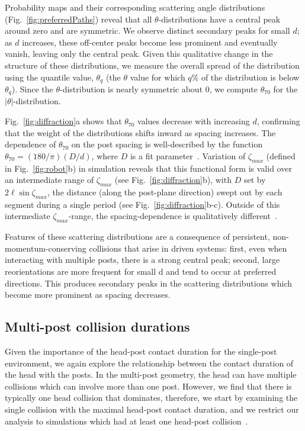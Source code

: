 \documentclass[aps,pre,twocolumn,superscriptaddress]{revtex4-1}
\begin{document}
Probability maps and their corresponding scattering angle distributions (Fig.~\ref{fig:preferredPaths}) reveal that all $\theta$-distributions have a central peak around zero and are symmetric.  We observe distinct secondary peaks for small $d$; as $d$ increases, these off-center peaks become less prominent and eventually vanish, leaving only the central peak.  Given this qualitative change in the structure of these distributions, we measure the overall spread of the distribution using the quantile value, $\theta_q$ (the $\theta$ value for which $q\%$ of the distribution is below $\theta_{q}$). Since the $\theta$-distribution is nearly symmetric about $0$, we compute $\theta_{70}$ for the $|\theta|$-distribution.

Fig.~\ref{fig:diffraction}a shows that $\theta_{70}$ values decrease with increasing $d$, confirming that the weight of the distributions shifts inward as spacing increases. The dependence of $\theta_{70}$ on the post spacing is well-described by the function $\theta_{70} = (180 / \pi)(D/d)$, where $D$ is a fit parameter~\cite{fitnote}. Variation of $\zeta_{max}$ (defined in Fig.~\ref{fig:robot}b) in simulation reveals that this functional form is valid over an intermediate range of $\zeta_{max}$ (see Fig.~\ref{fig:diffraction}b), with $D$ set by $2\ell\sin\zeta_{max}$, the distance (along the post-plane direction) swept out by each segment during a single period (see Fig.~\ref{fig:diffraction}b-c). Outside of this intermediate $\zeta_{max}$-range, the spacing-dependence is qualitatively different~\cite{supplemental}.  

Features of these scattering distributions are a consequence of persistent, non-momentum-conserving collisions that arise in driven systems: first, even when interacting with multiple posts, there is a strong central peak; second, large reorientations are more frequent for small d and tend to occur at preferred directions. This produces secondary peaks in the scattering distributions which become more prominent as spacing decreases.
 

\subsection{Multi-post collision durations}\label{sec:times} 

Given the importance of the head-post contact duration for the single-post environment, we again explore the relationship between the contact duration of the head with the posts.  In the multi-post geometry, the head can have multiple collisions which can involve more than one post.  However, we find that there is typically one head collision that dominates, therefore, we start by examining the single collision with the maximal head-post contact duration, and we restrict our analysis to simulations which had at least one head-post collision~\cite{supplemental}. 
\end{document}
